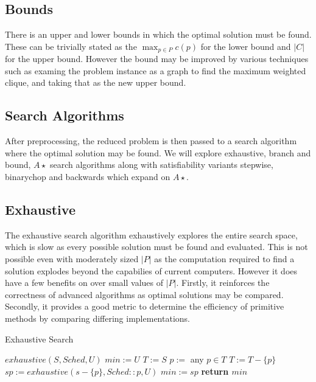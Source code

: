 \subsection{Bounds} There is an upper and lower bounds in which the optimal
solution must be found. These can be trivially stated as the $\max_{p \in P}
c(p)$ for the lower bound and $|C|$ for the upper bound. However the bound may
be improved by various techniques such as examing the problem instance as a graph to find the maximum weighted clique, and taking that as the new upper bound. 

\subsection{Search Algorithms}

After preprocessing, the reduced problem is then passed to a search algorithm
where the optimal solution may be found. We will explore exhaustive, branch and
bound, $A\star$ search algorithms along with satisfiability variants stepwise,
binarychop and backwards which expand on $A\star$.

\subsection{Exhaustive}

The exhaustive search algorithm exhaustively explores the entire search space,
which  is slow as every possible solution must be found and evaluated. This is
not possible even with moderately sized $|P|$ as the computation required to
find a solution explodes beyond the capabilies of current computers. However it
does have a few benefits on over small values of $|P|$.  Firstly, it reinforces
the correctness of advanced algorithms as optimal solutions may be compared.
Secondly, it provides a good metric to determine the efficiency of primitive
methods by comparing differing implementations.

\begin{algorithm}[H]
\caption{Exhaustive Search}
\label{alg1}
\begin{algorithmic}
\REQUIRE $exhaustive(S,Sched,U)$
\STATE $min := U$
\STATE $T := S$
\STATE $p :=$ any $p \in T$
\STATE $T := T - \{p\}$
\STATE $sp := exhaustive(s-\{p\}, Sched::p,U)$
\STATE $min := sp$
\ENDIF
\STATE \bf return $min$
\ENDWHILE
\ENSURE 
\end{algorithmic}
\end{algorithm}

